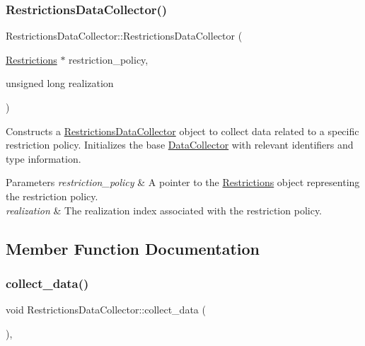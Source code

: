 \subsubsection{\texorpdfstring{Restrictions\+Data\+Collector()}{RestrictionsDataCollector()}}
{\footnotesize\ttfamily Restrictions\+Data\+Collector\+::\+Restrictions\+Data\+Collector (\begin{DoxyParamCaption}\item[{\mbox{\hyperlink{classRestrictions}{Restrictions}} $\ast$}]{restriction\+\_\+policy,  }\item[{unsigned long}]{realization }\end{DoxyParamCaption})\hspace{0.3cm}{\ttfamily [explicit]}}



Constructs a {\ttfamily \mbox{\hyperlink{classRestrictionsDataCollector}{Restrictions\+Data\+Collector}}} object to collect data related to a specific restriction policy. Initializes the base {\ttfamily \mbox{\hyperlink{classDataCollector}{Data\+Collector}}} with relevant identifiers and type information. 


\begin{DoxyParams}{Parameters}
{\em restriction\+\_\+policy} & A pointer to the {\ttfamily \mbox{\hyperlink{classRestrictions}{Restrictions}}} object representing the restriction policy. \\
\hline
{\em realization} & The realization index associated with the restriction policy. \\
\hline
\end{DoxyParams}


\subsection{Member Function Documentation}
\mbox{\label{classRestrictionsDataCollector_a7d8b6433ec25a53ed50577c2cf89912d}} 
\subsubsection{\texorpdfstring{collect\+\_\+data()}{collect\_data()}}
{\footnotesize\ttfamily void Restrictions\+Data\+Collector\+::collect\+\_\+data (\begin{DoxyParamCaption}{ }\end{DoxyParamCaption})\hspace{0.3cm}{\ttfamily [override]}, {\ttfamily [virtual]}}



